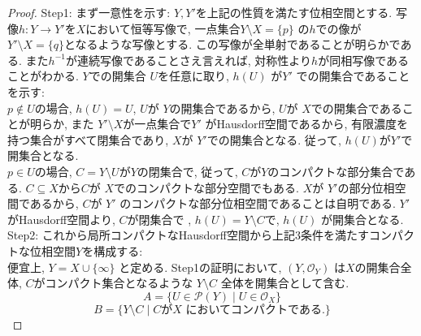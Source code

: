 \documentclass[lualatex]{ltjsbook}
\theoremstyle{remark}
\theoremstyle{plain}
\begin{document}
\begin{proof}
	Step1: まず一意性を示す: $Y, Y'$を上記の性質を満たす位相空間とする. 
	写像$h: Y \to Y'$を$X$において恒等写像で,   
	一点集合$Y\setminus X = \{p\} $ の$h$での像が
	$Y' \setminus X = \{q\} $となるような写像とする.
	この写像が全単射であることが明らかである. 
	また$h^{-1}$が連続写像であることさえ言えれば, 
	対称性より$h$が同相写像であることがわかる. 
	$Y$での開集合 $U$を任意に取り,  $h\left( U \right) $ が$Y'$ での開集合であることを示す:\\
	$ p \not\in U$の場合,  $h(U) =U$,  $U$が $Y$の開集合であるから,   
	$U$が $X$での開集合であることが明らか,  
	また $Y ' \setminus X$が一点集合で$Y '$ がHausdorff空間であるから,  有限濃度を持つ集合がすべて閉集合であり, 
	$X$が $Y'$での開集合となる. 従って,  $h\left( U \right) $が$Y'$で開集合となる.\\
	$p \in U$の場合,  $C = Y \setminus U$が$Y$の閉集合で,  
	従って,  $C$が$Y$のコンパクトな部分集合である.
	$C \subseteq X$から$C$が $X$でのコンパクトな部分空間でもある. 
	$X$が $Y'$の部分位相空間であるから,   $C $が $Y'$ のコンパクトな部分位相空間であることは自明である.
	$Y'$がHausdorff空間より,   $C$が閉集合で ,  $ h\left( U \right)  = Y \setminus C$で,  $h\left( U \right) $ が開集合となる.\\
	Step2: これから局所コンパクトなHausdorff空間から上記3条件を満たすコンパクトな位相空間$Y$を構成する:\\
	 便宜上,  $Y = X \cup \{ \infty \} $ と定める. Step1の証明において,   $\left( Y ,  \mathcal{O}_{Y} \right)$ は$X$の開集合全体,  $C$がコンパクト集合となるような $Y \setminus C$ 全体を開集合として含む. 
	 $$
		 A = \{U \in \mathcal{P}(Y)  \mid  U \in \mathcal{O}_X \} 
		 $$
		 $$
		 B= \{Y \setminus C  \mid \text{$C$が$X$ においてコンパクトである.}\}  
		 $$


\end{proof}
\end{document}
